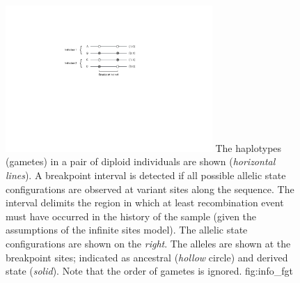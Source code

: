 

\begin{figure}[!htb]
\centering
\includegraphics[width=0.7\textwidth]{./img/ch3/info_fgt}
{The  haplotypes (gametes) in a pair of  diploid individuals are shown (\emph{horizontal lines}).
A breakpoint interval is detected if all  possible allelic state configurations are observed at  variant sites along the sequence.
The interval delimits the region in which at least  recombination event must have occurred in the history of the sample (given the assumptions of the infinite sites model).
The  allelic state configurations are shown on the \emph{right}.
The alleles are shown at the  breakpoint sites; indicated as ancestral (\emph{hollow} circle) and derived state (\emph{solid}).
Note that the order of gametes is ignored.}
{fig:info_fgt}
\end{figure}
